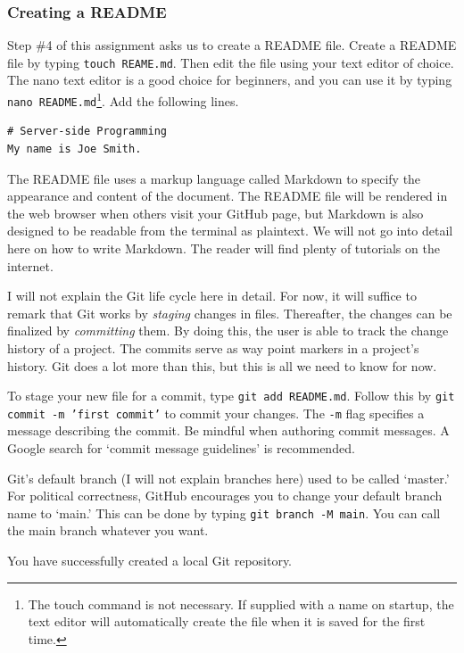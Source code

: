 \documentclass{article}
\begin{document}
\subsubsection{Creating a README}

Step \#4 of this assignment asks us to create a README file.  Create a README
file by typing \texttt{touch REAME.md}. Then edit the file using your
text editor of choice. The nano text editor is a good choice for beginners, and
you can use it by typing \texttt{nano README.md}\footnote{The touch
command is not necessary. If supplied with a name on startup, the text editor
will automatically create the file when it is saved for the first time.}. Add
the following lines.

\begin{verbatim}
# Server-side Programming
My name is Joe Smith.
\end{verbatim}

The README file uses a markup language called Markdown to specify the appearance
and content of the document. The README file will be rendered in the web browser
when others visit your GitHub page, but Markdown is also designed to be readable
from the terminal as plaintext. We will not go into detail here on how to write
Markdown. The reader will find plenty of tutorials on the internet.

I will not explain the Git life cycle here in detail. For now, it will suffice
to remark that Git works by \emph{staging} changes in files. Thereafter, the
changes can be finalized by \emph{committing} them. By doing this, the user is
able to track the change history of a project. The commits serve as way point
markers in a project's history. Git does a lot more than this, but this is all
we need to know for now.

To stage your new file for a commit, type \texttt{git add README.md}.
Follow this by \texttt{git commit -m 'first commit'} to commit your
changes. The \verb|-m| flag specifies a message describing the commit. Be
mindful when authoring commit messages. A Google search for `commit message
guidelines' is recommended.

Git's default branch (I will not explain branches here) used to be called
`master.' For political correctness, GitHub encourages you to change your
default branch name to `main.' This can be done by typing \texttt{git
branch -M main}. You can call the main branch whatever you want.

You have successfully created a local Git repository. 
\end{document}
